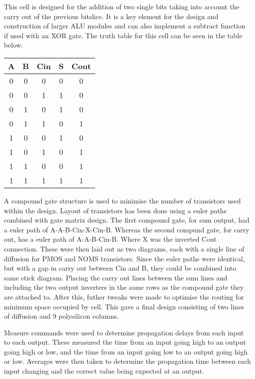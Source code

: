 
This cell is designed for the addition of two single bits taking into account the carry out of the previous bitslice.
It is a key element for the design and construction of larger ALU modules and can also implement a subtract function if used with an XOR gate.
The truth table for this cell can be seen in the table below.

\begin{tabular}{| c | c | c || c | c |}
\hline
A & B & Cin & S & Cout \\ \hline
0 & 0 & 0   & 0 & 0    \\
0 & 0 & 1   & 1 & 0    \\
0 & 1 & 0   & 1 & 0    \\
0 & 1 & 1   & 0 & 1    \\
1 & 0 & 0   & 1 & 0    \\
1 & 0 & 1   & 0 & 1    \\
1 & 1 & 0   & 0 & 1    \\
1 & 1 & 1   & 1 & 1    \\ \hline
\end{tabular}

A compound gate structure is used to minimise the number of transistors used within the design. 
Layout of transistors has been done using a euler paths combined with gate matrix design.
The first compound gate, for sum output, had a euler path of A-A-B-Cin-X-Cin-B. Whereas the second compund gate, for carry out, has a euler path of A-A-B-Cin-B. Where X was the inverted Cout connection.
These were then laid out as two diagrams, each with a single line of diffusion for PMOS and NOMS transistors.
Since the euler paths were identical, but with a gap in carry out between Cin and B, they could be combined into same stick diagram. Placing the carry out lines between the sum lines and including the two output inverters in the same rows as the compound gate they are attached to.
After this, futher tweaks were made to optimise the routing for minimum space occupied by cell. 
This gave a final design consisting of two lines of diffusion and 9 polysilicon columns. 


Measure commands were used to determine propagation delays from each input to each output. These measured the time from an input going high to an output going high or low, and the time from an input going low to an output going high or low. 
Averages were then taken to determine the propagation time between each input changing and the correct value being expected at an output. 
